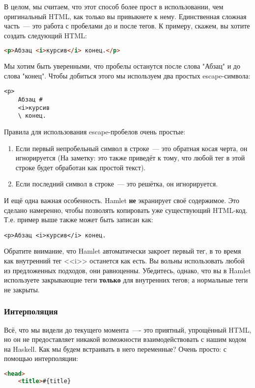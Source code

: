 В целом, мы считаем, что этот способ более прост в использовании, чем
оригинальный HTML, как только вы привыкнете к нему. Единственная
сложная часть~--- это работа с пробелами до и после тегов. К примеру, скажем, вы
хотите создать следующий HTML:

\begin{lstlisting}[language=HTML]
<p>Абзац <i>курсив</i> конец.</p>
\end{lstlisting}

Мы хотим быть уверенными, что пробелы останутся после слова "Абзац" и до слова
"конец". Чтобы добиться этого мы используем два простых escape-символа:

\begin{lstlisting}
<p>
    Абзац #
    <i>курсив
    \ конец.
\end{lstlisting}

Правила для использования escape-пробелов очень простые:
\begin{enumerate}
    \item Если первый непробельный символ в строке~--- это обратная косая черта,
        он игнорируется (На заметку: это также приведёт к тому, что любой тег
        в этой строке будет обработан как простой текст).
    \item Если последний символ в строке~--- это решётка, он игнорируется.
\end{enumerate}

И ещё одна важная особенность. Hamlet \textbf{не} экранирует своё содержимое.
Это сделано намеренно, чтобы позволять копировать уже существующий HTML-код.
Т.е. пример выше также может быть записан как:
\begin{lstlisting}
<p>Абзац <i>курсив</i> конец.
\end{lstlisting}

Обратите внимание, что Hamlet автоматически закроет первый тег, в то время как
внутренний тег <<i>> останется как есть. Вы вольны использовать любой из
предложенных подходов, они равноценны. Убедитесь, однако, что вы в Hamlet
используете закрывающие теги \textbf{только} для внутренних тегов; а нормальные
теги не закрыты.

\subsubsection{Интерполяция}

Всё, что мы видели до текущего момента~---- это приятный, упрощённый
HTML, но он не предоставляет никакой возможности взаимодействовать с
нашим кодом на Haskell.  Как мы будем встраивать в него переменные?
Очень просто: с помощью интерполяции:
\begin{lstlisting}[language=HTML]
<head>
    <title>#{title}
\end{lstlisting}


